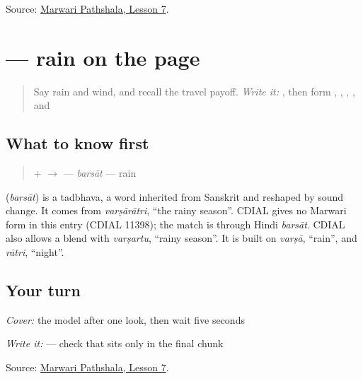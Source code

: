 \begin{tcolorbox}[breakable,colback=teal!4,colframe=teal!35!black,title={Before you move on}]
Source: \href{https://www.marwaripathshala.com/marwari-lesson-7-english}{Marwari Pathshala, Lesson 7}.
\end{tcolorbox}
\section[\texorpdfstring{\mw{बरसात} (barsāt)}{बरसात (barsāt)}]{ — rain on the page}

\label{lesson:MW-C11-barsaat}



\begin{quote}
Say rain and wind, and recall the travel payoff. \emph{Write it:} \textbf{}, then form \textbf{}, \textbf{}, \textbf{}, \textbf{}, and \textbf{}
\end{quote}

\subsection*{What to know first}
\begin{quote}
\textbf{} + \textbf{} $\to$ \textbf{} — \emph{barsāt} — rain
\end{quote}

\begin{cousinweb}
\textbf{} (\emph{barsāt}) is a tadbhava, a word inherited from Sanskrit and reshaped by sound change. It comes from \emph{varṣārātri}, \textquotedblleft{}the rainy season\textquotedblright{}. CDIAL gives no Marwari form in this entry (CDIAL 11398); the match is through Hindi \emph{barsāt}. CDIAL also allows a blend with \emph{varṣartu}, \textquotedblleft{}rainy season\textquotedblright{}. It is built on \emph{varṣā}, \textquotedblleft{}rain\textquotedblright{}, and \emph{rātri}, \textquotedblleft{}night\textquotedblright{}.
\end{cousinweb}

\subsection*{Your turn}
\emph{Cover:} the model after one look, then wait five seconds

\emph{Write it:} \textbf{} — check that \textbf{} sits only in the final chunk

\begin{tcolorbox}[breakable,colback=teal!4,colframe=teal!35!black,title={Before you move on}]
Source: \href{https://www.marwaripathshala.com/marwari-lesson-7-english}{Marwari Pathshala, Lesson 7}.
\end{tcolorbox}
